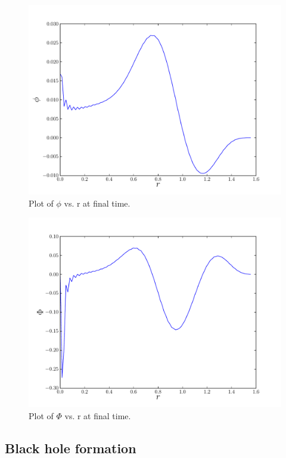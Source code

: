 \documentclass[12pt]{article}
\begin{document}
\begin{figure}
 \centering
 \includegraphics[width=12cm]{phivrR.pdf}
 \caption{Plot of $\phi$ vs. r at final time.}
 \label{fig:R-phi}
\end{figure}

\begin{figure}
 \centering
 \includegraphics[width=12cm]{PhivrR.pdf}
 \caption{Plot of $\Phi$ vs. r at final time.}
 \label{fig:R-Phi} 
\end{figure}

\subsection{Black hole formation}
\end{document}
